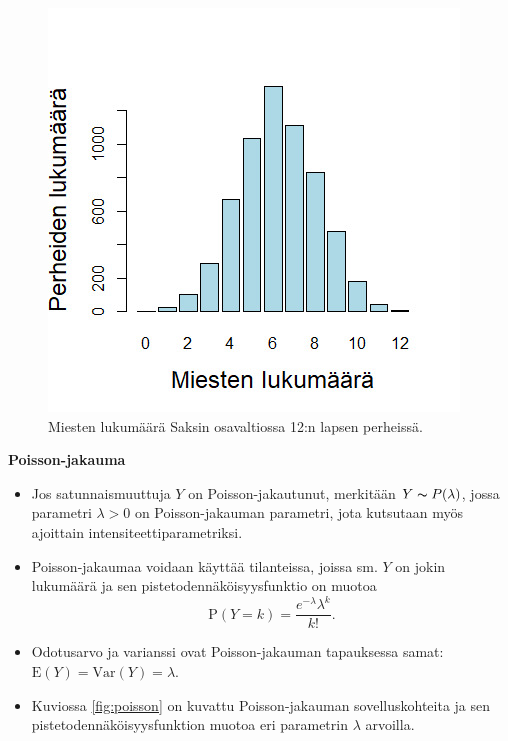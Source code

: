 \documentclass[
]{book}
\begin{document}
\FloatBarrier

\begin{figure}

{\centering \includegraphics[width=7.5\linewidth]{images/Miesten_lkm} 

}

\caption{Miesten lukumäärä Saksin osavaltiossa 12:n lapsen perheissä.}\label{fig:miestenlkm}
\end{figure}

\FloatBarrier

\textbf{Poisson-jakauma}

\begin{itemize}
\item
  Jos satunnaismuuttuja \(Y\) on Poisson-jakautunut, merkitään \(Y \thicksim P(\lambda)\), jossa parametri \(\lambda > 0\) on Poisson-jakauman parametri, jota kutsutaan myös ajoittain intensiteettiparametriksi.
\item
  Poisson-jakaumaa voidaan käyttää tilanteissa, joissa sm. \(Y\) on jokin lukumäärä ja sen pistetodennäköisyysfunktio on muotoa
  \[
  \text{P}(Y=k) = \frac{e^{-\lambda} \lambda^k}{k!}.
  \]
\item
  Odotusarvo ja varianssi ovat Poisson-jakauman tapauksessa samat: \(\text{E}(Y) = \mathrm{Var}(Y) = \lambda\).
\item
  Kuviossa \ref{fig:poisson} on kuvattu Poisson-jakauman sovelluskohteita ja sen pistetodennäköisyysfunktion muotoa eri parametrin \(\lambda\) arvoilla.
\end{itemize}
\end{document}
